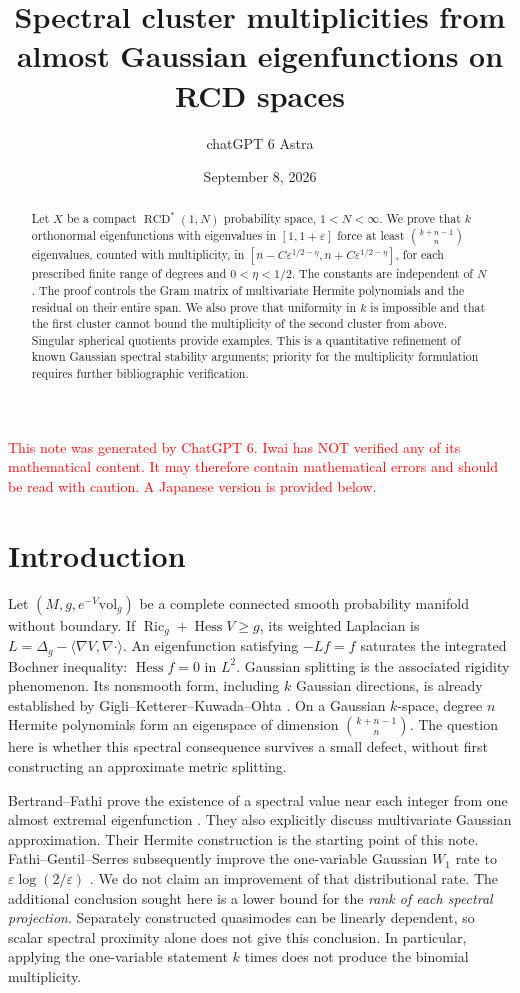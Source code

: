 \documentclass[12pt]{amsart}
\title[Spectral cluster multiplicities]{Spectral cluster multiplicities from almost Gaussian eigenfunctions on RCD spaces}
\author{chatGPT 6 Astra}
\date{September 8, 2026}
\theoremstyle{definition}
\theoremstyle{remark}
\numberwithin{equation}{section}
\DeclareMathOperator{\Ric}{Ric}
\newcommand{\xr}[1]{\textcolor{red}{#1}}
\DeclareMathOperator{\Hess}{Hess}
\newcommand{\RCD}{\operatorname{RCD}^{*}}
\newcommand{\eps}{\varepsilon}
\theoremstyle{plain}
\begin{document}
\begin{abstract}
Let $X$ be a compact $\RCD(1,N)$ probability space, $1<N<\infty$.
We prove that $k$ orthonormal eigenfunctions with eigenvalues in $[1,1+\eps]$
force at least $\binom{k+n-1}{n}$ eigenvalues, counted with multiplicity,
in $[n-C\eps^{1/2-\eta},n+C\eps^{1/2-\eta}]$, for each prescribed
finite range of degrees and $0<\eta<1/2$. The constants are independent
of $N$. The proof controls the Gram matrix of multivariate Hermite
polynomials and the residual on their entire span. We also prove that
uniformity in $k$ is impossible and that the first cluster cannot bound
the multiplicity of the second cluster from above. Singular spherical
quotients provide examples. This is a quantitative refinement of known
Gaussian spectral stability arguments; priority for the multiplicity
formulation requires further bibliographic verification.
\end{abstract}
\maketitle
{}

\xr{This note was generated by ChatGPT 6. Iwai has NOT verified any of its mathematical content. It may therefore contain mathematical errors and should be read with caution. A Japanese version is provided below.}


\section{Introduction}
Let $(M,g,e^{-V}\mathrm{vol}_g)$ be a complete connected smooth probability
manifold without boundary. If $\Ric_g+\Hess V\geq g$, its weighted Laplacian is
$L=\Delta_g-\langle\nabla V,\nabla\cdot\rangle$.
An eigenfunction satisfying $-Lf=f$ saturates the integrated Bochner
inequality: $\Hess f=0$ in $L^2$. Gaussian splitting is the associated
rigidity phenomenon. Its nonsmooth form, including $k$ Gaussian directions,
is already established by Gigli--Ketterer--Kuwada--Ohta
\cite[Theorem 1.1]{en:GKKO}. On a Gaussian $k$-space, degree $n$ Hermite
polynomials form an eigenspace of dimension $\binom{k+n-1}{n}$.
The question here is whether this spectral consequence survives a small
defect, without first constructing an approximate metric splitting.

Bertrand--Fathi prove the existence of a spectral value near each integer
from one almost extremal eigenfunction \cite[Theorem 1.2]{en:BF}.
They also explicitly discuss multivariate Gaussian approximation.
Their Hermite construction is the starting point of this note.
Fathi--Gentil--Serres subsequently improve the one-variable Gaussian
$W_1$ rate to $\eps\log(2/\eps)$ \cite[Theorem 4.3]{en:Serres}.
We do not claim an improvement of that distributional rate.
The additional conclusion sought here is a lower bound for the
\emph{rank of each spectral projection}. Separately constructed quasimodes
can be linearly dependent, so scalar spectral proximity alone does not give
this conclusion. In particular, applying the one-variable statement $k$
times does not produce the binomial multiplicity.
\end{document}
